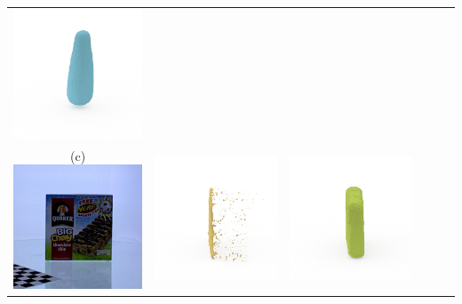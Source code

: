 \documentclass[10pt,onecolumn,letterpaper]{article}
\begin{document}
\begin{tabular}{cccccc}
\includegraphics[height=\turnheight, clip=true, trim=60 30 30 5]{vo5_extra_body_volumizing_shampoo_NP2_216_oma_view_0} \\
(c) \includegraphics[height=\turnheight, clip=true, trim=20 30 30 5]{quaker_big_chewy_chocolate_chip.png} &
\includegraphics[height=\turnheight, clip=true, trim=60 30 30 5]{quaker_big_chewy_chocolate_chip_NP1_0_visible_pixels_view_0.png} &
\includegraphics[height=\turnheight, clip=true, trim=60 30 30 5]{quaker_big_chewy_chocolate_chip_NP1_0_gt_view_0.png} &

\end{tabular}
\end{document}
